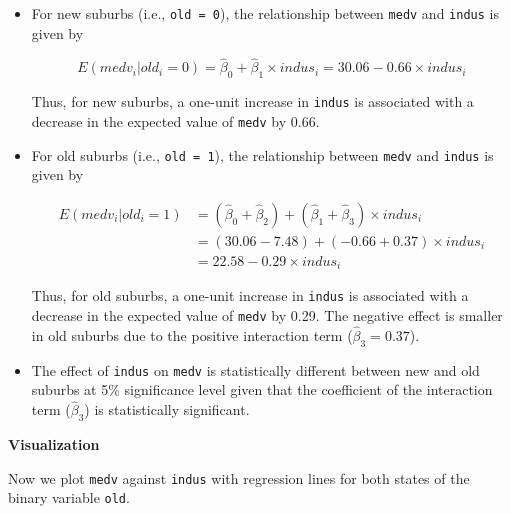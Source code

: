 \documentclass[
  12pt,
  a4paper,
]{scrbook}
\theoremstyle{plain}
\theoremstyle{definition}
\theoremstyle{remark}
\begin{document}
\begin{itemize}
\item
  For new suburbs (i.e., \texttt{old\ =\ 0}), the relationship between
  \texttt{medv} and \texttt{indus} is given by

  \[
  E(medv_i | old_i = 0) = \hat{\beta}_0 + \hat{\beta}_1 \times indus_i = 30.06 - 0.66 \times indus_i
  \]

  Thus, for new suburbs, a one-unit increase in \texttt{indus} is
  associated with a decrease in the expected value of \texttt{medv} by
  0.66.
\item
  For old suburbs (i.e., \texttt{old\ =\ 1}), the relationship between
  \texttt{medv} and \texttt{indus} is given by

  \[
  \begin{split}
  E(medv_i | old_i = 1) &= (\hat{\beta}_0 + \hat{\beta}_2) + (\hat{\beta}_1 + \hat{\beta}_3) \times indus_i \\
  &= (30.06 - 7.48) + (-0.66 + 0.37) \times indus_i \\
  &= 22.58 - 0.29 \times indus_i
  \end{split}
  \]

  Thus, for old suburbs, a one-unit increase in \texttt{indus} is
  associated with a decrease in the expected value of \texttt{medv} by
  0.29. The negative effect is smaller in old suburbs due to the
  positive interaction term (\(\hat{\beta}_3 = 0.37\)).
\item
  The effect of \texttt{indus} on \texttt{medv} is statistically
  different between new and old suburbs at 5\% significance level given
  that the coefficient of the interaction term (\(\hat{\beta}_3\)) is
  statistically significant.
\end{itemize}

\textbf{Visualization}

Now we plot \texttt{medv} against \texttt{indus} with regression lines
for both states of the binary variable \texttt{old}.
\end{document}
